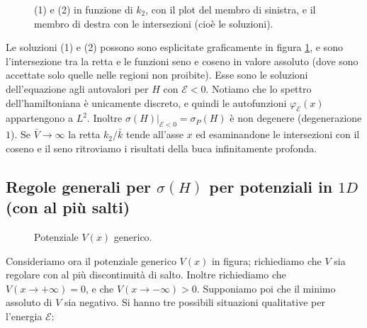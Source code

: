 \documentclass[../../FisicaTeorica.tex]{subfiles}
\begin{document}
\begin{figure}
\centering

\caption{(1) e (2) in funzione di $k_2$, con il plot del membro di sinistra, e il membro di destra con le intersezioni (cioè le soluzioni).}
\label{fig:solution1and2}
\end{figure}
Le soluzioni (1) e (2) possono sono esplicitate graficamente in figura \ref{fig:solution1and2}, e sono l'intersezione tra la retta e le funzioni seno e coseno in valore assoluto (dove sono accettate solo quelle nelle regioni non proibite). Esse sono le soluzioni dell'equazione agli autovalori per $H$ con $\mathcal{E}<0$. Notiamo che lo spettro dell'hamiltoniana è unicamente discreto, e quindi le autofunzioni $\varphi_\mathcal{E}(x)$ appartengono a $L^2$. Inoltre $\sigma(H)|_{\mathcal{E}<0}=\sigma_P(H)$ è non degenere (degenerazione $1$). Se $\bar{V}\to\infty$ la retta $k_2/\bar{k}$ tende all'asse $x$ ed esaminandone le intersezioni con il coseno e il seno ritroviamo i risultati della buca infinitamente profonda.\\

\subsection{Regole generali per $\sigma(H)$ per potenziali in $1D$ (con al più salti)}
\label{sec:potenziali_generici}
\begin{figure}[H]
\centering

\caption{Potenziale $V(x)$ generico.}
\end{figure}

Consideriamo ora il potenziale generico $V(x)$ in figura; richiediamo che $V$ sia regolare con al più discontinuità di salto. Inoltre richiediamo che $V(x\to + \infty)=0$, e che $V(x\to-\infty) > 0$. Supponiamo poi che il minimo assoluto di $V$ sia negativo. Si hanno tre possibili situazioni qualitative per l'energia $\mathcal E$:
\end{document}
